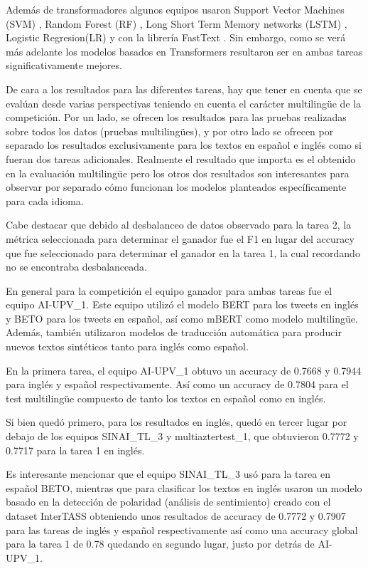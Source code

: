 Además de transformadores algunos equipos usaron Support Vector Machines (SVM) \cite{rameshbhai2019opinion}, Random Forest (RF) \cite{antony2020dynamic}, Long Short Term Memory networks (LSTM) \cite{mostafa2022bidirectional}, Logistic Regresion(LR) \cite{vimal2020application} y con la librería FastText \cite{bhattacharjee2018fasttext}. Sin embargo, como se verá más adelante los modelos basados en Transformers resultaron ser en ambas tareas significativamente mejores.

De cara a los resultados para las diferentes tareas, hay que tener en cuenta que se evalúan desde varias perspectivas teniendo en cuenta el carácter multilingüe de la competición. Por un lado, se ofrecen los resultados para las pruebas realizadas sobre todos los datos (pruebas multilingües), y por otro lado se ofrecen por separado los resultados exclusivamente para los textos en español e inglés como si fueran dos tareas adicionales. Realmente el resultado que importa es el obtenido en la evaluación multilingüe pero los otros dos resultados son interesantes para observar por separado cómo funcionan los modelos planteados específicamente para cada idioma.

Cabe destacar que debido al desbalanceo de datos observado para la tarea 2, la métrica seleccionada para determinar el ganador fue el F1 en lugar del accuracy que fue seleccionado para determinar el ganador en la tarea 1, la cual recordando no se encontraba desbalanceada.

En general para la competición el equipo ganador para ambas tareas fue el equipo AI-UPV\_1. Este equipo utilizó el modelo BERT para los tweets en inglés y BETO para los tweets en español, así como mBERT como modelo multilingüe. Además, también utilizaron modelos de traducción automática para producir nuevos textos sintéticos tanto para inglés como español.

En la primera tarea, el equipo AI-UPV\_1 obtuvo un accuracy de 0.7668 y 0.7944 para inglés y español respectivamente. Así como un accuracy de 0.7804 para el test multilingüe compuesto de tanto los textos en español como en inglés.

Si bien quedó primero, para los resultados en inglés, quedó en tercer lugar por debajo de los equipos SINAI\_TL\_3 y multiaztertest\_1, que obtuvieron 0.7772 y 0.7717 para la tarea 1 en inglés. 

Es interesante mencionar que el equipo SINAI\_TL\_3 usó para la tarea en español BETO, mientras que para clasificar los textos en inglés usaron un modelo basado en la detección de polaridad \cite{sharma2014polarity} (análisis de sentimiento) creado con el dataset InterTASS \cite{martinez2018overview} obteniendo unos resultados de accuracy de 0.7772 y 0.7907 para las tareas de inglés y español respectivamente así como una accuracy global para la tarea 1 de 0.78 quedando en segundo lugar, justo por detrás de AI-UPV\_1.

